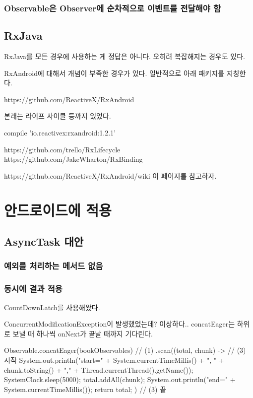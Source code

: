 \documentclass{book}
\begin{document}
\subsection{Observable은 Observer에 순차적으로 이벤트를 전달해야 함}

\section{RxJava}
RxJava를 모든 경우에 사용하는 게 정답은 아니다.
오히려 복잡해지는 경우도 있다.

RxAndroid에 대해서 개념이 부족한 경우가 있다. 일반적으로 아래 패키지를 지칭한다.

https://github.com/ReactiveX/RxAndroid

본래는 라이프 사이클 등까지 있었다.


compile 'io.reactivex:rxandroid:1.2.1' 



https://github.com/trello/RxLifecycle
https://github.com/JakeWharton/RxBinding

https://github.com/ReactiveX/RxAndroid/wiki 이 페이지를 참고하자.

\chapter{안드로이드에 적용}
\section{AsyncTask 대안}
\subsection{예외를 처리하는 메서드 없음}


\subsection{동시에 결과 적용}
CountDownLatch를 사용해왔다.

ConcurrentModificationException이 발생했었는데? 이상하다..
concatEager는 하위로 보낼 때 하나씩 onNext가 끝날 때까지 기다린다.

        Observable.concatEager(bookObservables) // (1)
            .scan((total, chunk) -> { // (3) 시작
                System.out.println("start=" + System.currentTimeMillis() + ", " + chunk.toString()
                + "," + Thread.currentThread().getName());
                SystemClock.sleep(5000);
                total.addAll(chunk);
                System.out.println("end=" + System.currentTimeMillis());
                return total;
            }) // (3) 끝
            
\end{document}
